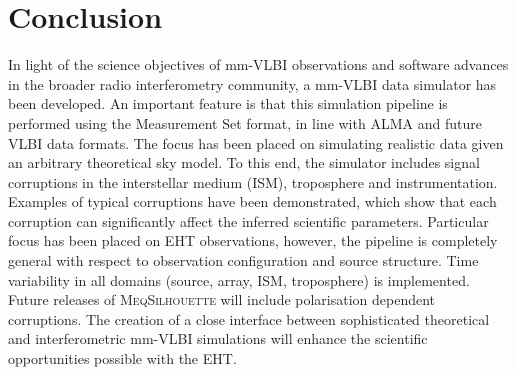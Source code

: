\chapter{Conclusion}

In light of the science objectives of mm-VLBI observations and software advances in the broader radio interferometry community, a mm-VLBI data simulator has been developed. An important feature is that this simulation pipeline is performed using the {\sc Measurement Set} format, in line with ALMA and future VLBI data formats. The focus has been placed on simulating realistic data given an arbitrary theoretical sky model. To this end, the simulator includes signal corruptions in the interstellar medium (ISM), troposphere and instrumentation. Examples of typical corruptions have been demonstrated, which show that each corruption can significantly affect the inferred scientific parameters. Particular focus has been placed on EHT observations, however, the pipeline is completely general with respect to observation configuration and source structure. Time variability in all domains (source, array, ISM, troposphere) is implemented.  Future releases of \textsc{MeqSilhouette} will include polarisation dependent corruptions. The creation of a close interface between sophisticated theoretical and interferometric mm-VLBI simulations will enhance the scientific opportunities possible with the EHT.